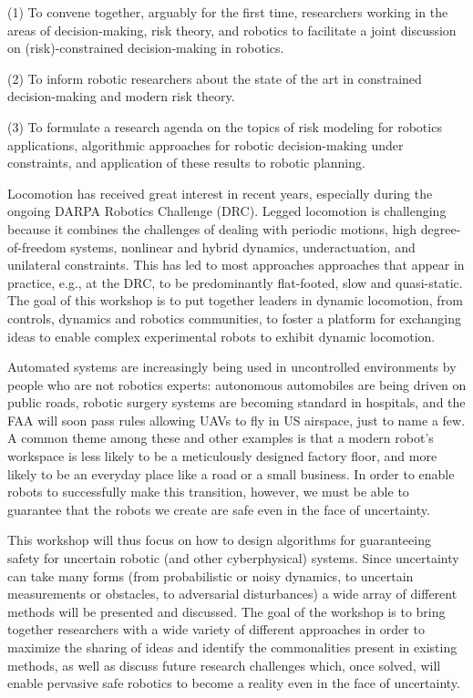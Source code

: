 \begin{spacing}{1.0}
{(1) To convene together, arguably for the first time, researchers working in the areas of decision-making, risk theory, and robotics to facilitate a joint discussion on (risk)-constrained decision-making in robotics.  

(2) To inform robotic researchers about the state of the art in constrained decision-making and modern risk theory.

(3) To formulate a research agenda on the topics of risk modeling for robotics applications, algorithmic approaches for robotic decision-making under constraints, and application of these results to robotic planning.
}



{
Locomotion has received great interest in recent years, especially during the ongoing DARPA Robotics Challenge (DRC).  Legged locomotion is challenging because it combines the challenges of dealing with periodic motions, high degree-of-freedom systems, nonlinear and hybrid dynamics, underactuation, and unilateral constraints.  This has led to most approaches approaches that appear in practice, e.g., at the DRC, to be predominantly flat-footed, slow and quasi-static.  The goal of this workshop is to put together leaders in dynamic locomotion, from controls, dynamics and robotics communities, to foster a platform for exchanging ideas to enable complex experimental robots to exhibit dynamic locomotion.
}



{
Automated systems are increasingly being used in uncontrolled environments by people who are not robotics experts: autonomous automobiles are being driven on public roads, robotic surgery systems are becoming standard in hospitals, and the FAA will soon pass rules allowing UAVs to fly in US airspace, just to name a few. A common theme among these and other examples is that a modern robot's workspace is less likely to be a meticulously designed factory floor, and more likely to be an everyday place like a road or a small business. In order to enable robots to successfully make this transition, however, we must be able to guarantee that the robots we create are safe even in the face of uncertainty.

This workshop will thus focus on how to design algorithms for guaranteeing safety for uncertain robotic (and other cyberphysical) systems. Since uncertainty can take many forms (from probabilistic or noisy dynamics, to uncertain measurements or obstacles, to adversarial disturbances) a wide array of different methods will be presented and discussed. The goal of the workshop is to bring together researchers with a wide variety of different approaches in order to maximize the sharing of ideas and identify the commonalities present in existing methods, as well as discuss future research challenges which, once solved, will enable pervasive safe robotics to become a reality even in the face of uncertainty.
}




\end{spacing}
